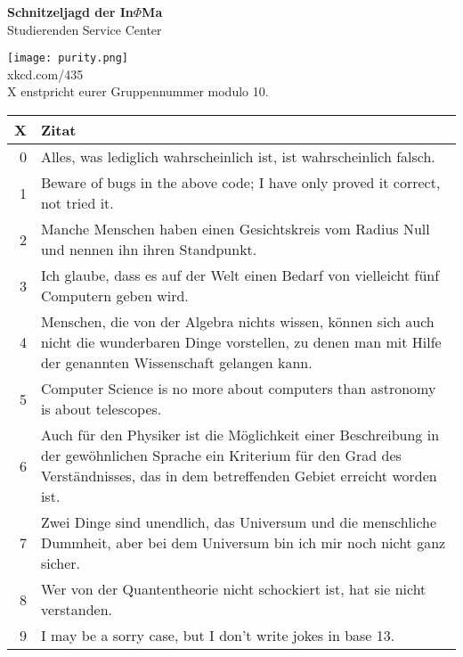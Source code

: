 \documentclass[a4paper,10pt]{article}
\newcommand{\titel}[2]{
\begin{center}
{\Huge \textbf{#1}}\vspace{\baselineskip}\\
{\LARGE #2}
\vspace{\baselineskip}
\end{center}
}
\begin{document}
\pagebreak

\titel{Schnitzeljagd der In$\Phi$Ma}{Studierenden Service Center}

\texttt{[image: purity.png]}\\
{\small xkcd.com/435}\\
\vspace{1.5\baselineskip}
\Large
X enstpricht eurer Gruppennummer modulo 10.\\
\vspace{\baselineskip}
\begin{tabularx}{0.9\textwidth}{r| X}
X & Zitat \\ \hline
0 & Alles, was lediglich wahrscheinlich ist, ist wahrscheinlich falsch. \\
1 & Beware of bugs in the above code; I have only proved it correct, not tried it. \\
2 & Manche Menschen haben einen Gesichtskreis vom Radius Null und nennen ihn ihren Standpunkt. \\
3 & Ich glaube, dass es auf der Welt einen Bedarf von vielleicht fünf Computern geben wird. \\
4 & Menschen, die von der Algebra nichts wissen, können sich auch nicht die wunderbaren Dinge vorstellen, zu denen man mit Hilfe der genannten Wissenschaft gelangen kann. \\
5 & Computer Science is no more about computers than astronomy is about telescopes. \\
6 & Auch für den Physiker ist die Möglichkeit einer Beschreibung in der gewöhnlichen Sprache ein Kriterium für den Grad des Verständnisses, das in dem betreffenden Gebiet erreicht worden ist. \\
7 & Zwei Dinge sind unendlich, das Universum und die menschliche Dummheit, aber bei dem Universum bin ich mir noch nicht ganz sicher.\\
8 & Wer von der Quantentheorie nicht schockiert ist, hat sie nicht verstanden.\\
9 & I may be a sorry case, but I don't write jokes in base 13.
\end{tabularx}


\pagebreak
\end{document}
